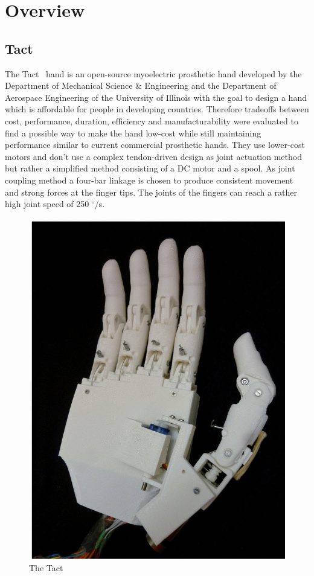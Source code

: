 \documentclass[a4paper, 10pt, conference]{ieeeconf}      %
\begin{document}
\section{Overview}

\subsection{Tact}

The Tact~\cite{tact} hand is an open-source myoelectric prosthetic hand developed by the Department of Mechanical Science \& Engineering and the Department of Aerospace Engineering of the University of Illinois with the goal to design a hand which is affordable for people in developing countries. Therefore tradeoffs between cost, performance, duration, efficiency and manufacturability were evaluated to find a possible way to make the hand low-cost while still maintaining performance similar to current commercial prosthetic hands. They use lower-cost motors and don't use a complex tendon-driven design as joint actuation method but rather a simplified method consisting of a DC motor and a spool. As joint coupling method a four-bar linkage is chosen to produce consistent movement and strong forces at the finger tips. The joints of the fingers can reach a rather high joint speed of 250 $^\circ$/s.

\begin{figure}[h]

	\centering
	\includegraphics[scale=0.25]{images/Tact}
	
	\caption{The Tact}
\end{figure}
\end{document}
